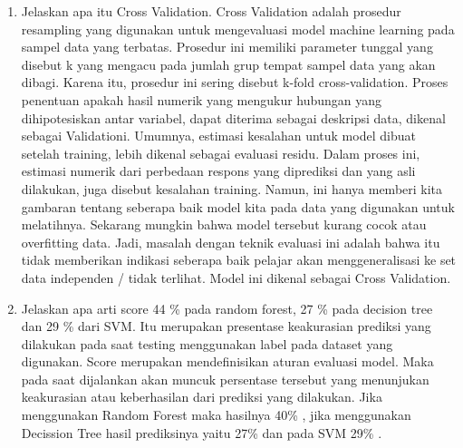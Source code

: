\begin{enumerate}
\item Jelaskan apa itu Cross Validation.
Cross Validation adalah prosedur resampling yang digunakan untuk mengevaluasi model machine learning pada sampel data yang terbatas. Prosedur ini memiliki parameter tunggal yang disebut k yang mengacu pada jumlah grup tempat sampel data yang akan dibagi. Karena itu, prosedur ini sering disebut k-fold cross-validation.
Proses penentuan apakah hasil numerik yang mengukur hubungan yang dihipotesiskan antar variabel, dapat diterima sebagai deskripsi data, dikenal sebagai Validationi. Umumnya, estimasi kesalahan untuk model dibuat setelah training, lebih dikenal sebagai evaluasi residu. Dalam proses ini, estimasi numerik dari perbedaan respons yang diprediksi dan yang asli dilakukan, juga disebut kesalahan training. Namun, ini hanya memberi kita gambaran tentang seberapa baik model kita pada data yang digunakan untuk melatihnya. Sekarang mungkin bahwa model tersebut kurang cocok atau overfitting data. Jadi, masalah dengan teknik evaluasi ini adalah bahwa itu tidak memberikan indikasi seberapa baik pelajar akan menggeneralisasi ke set data independen / tidak terlihat. Model ini dikenal sebagai Cross Validation.

\item Jelaskan apa arti score 44 \% pada random forest, 27 \% pada decision tree dan 29 \% dari SVM.
Itu merupakan presentase keakurasian prediksi yang dilakukan pada saat testing menggunakan label pada dataset yang digunakan. Score merupakan mendefinisikan aturan evaluasi model. Maka pada saat dijalankan akan muncuk persentase tersebut yang menunjukan keakurasian atau keberhasilan dari prediksi yang dilakukan. Jika menggunakan Random Forest maka hasilnya 40\% , jika menggunakan Decission Tree hasil prediksinya yaitu 27\% dan pada SVM 29\% .


\end{enumerate}
